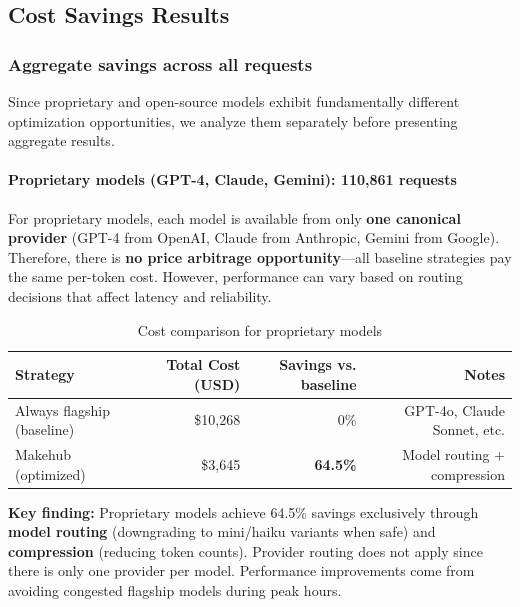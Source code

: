 \documentclass[english]{article}
\begin{document}
\subsection{Cost Savings Results}

\subsubsection{Aggregate savings across all requests}

Since proprietary and open-source models exhibit fundamentally different optimization opportunities, we analyze them separately before presenting aggregate results.

\paragraph{Proprietary models (GPT-4, Claude, Gemini): 110,861 requests}

For proprietary models, each model is available from only \textbf{one canonical provider} (GPT-4 from OpenAI, Claude from Anthropic, Gemini from Google). Therefore, there is \textbf{no price arbitrage opportunity}—all baseline strategies pay the same per-token cost. However, performance can vary based on routing decisions that affect latency and reliability.

\begin{table}[H]
\centering
\caption{Cost comparison for proprietary models}
\label{tab:cost_comparison_proprietary}
\begin{tabular}{|l|r|r|r|}
\hline
\textbf{Strategy} & \textbf{Total Cost (USD)} & \textbf{Savings vs. baseline} & \textbf{Notes} \\
\hline
Always flagship (baseline) & \$10,268 & 0\% & GPT-4o, Claude Sonnet, etc. \\
\hline
Makehub (optimized) & \$3,645 & \textbf{64.5\%} & Model routing + compression \\
\hline
\end{tabular}
\end{table}

\medskip

\noindent\textbf{Key finding:} Proprietary models achieve 64.5\% savings exclusively through \textbf{model routing} (downgrading to mini/haiku variants when safe) and \textbf{compression} (reducing token counts). Provider routing does not apply since there is only one provider per model. Performance improvements come from avoiding congested flagship models during peak hours.
\end{document}
